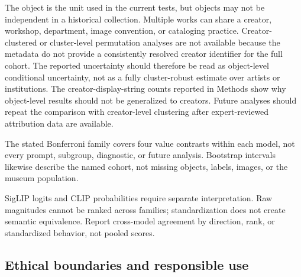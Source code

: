 \documentclass[pdflatex,sn-basic,Numbered]{sn-jnl}
\begin{document}
The object is the unit used in the current tests, but objects may not be independent in a historical collection. Multiple works can share a creator, workshop, department, image convention, or cataloging practice. Creator-clustered or cluster-level permutation analyses are not available because the metadata do not provide a consistently resolved creator identifier for the full cohort. The reported uncertainty should therefore be read as object-level conditional uncertainty, not as a fully cluster-robust estimate over artists or institutions. The creator-display-string counts reported in Methods show why object-level results should not be generalized to creators. Future analyses should repeat the comparison with creator-level clustering after expert-reviewed attribution data are available.

The stated Bonferroni family covers four value contrasts within each model, not every prompt, subgroup, diagnostic, or future analysis. Bootstrap intervals likewise describe the named cohort, not missing objects, labels, images, or the museum population.

SigLIP logits and CLIP probabilities require separate interpretation. Raw magnitudes cannot be ranked across families; standardization does not create semantic equivalence. Report cross-model agreement by direction, rank, or standardized behavior, not pooled scores.

\subsection{Ethical boundaries and responsible use}
\end{document}
